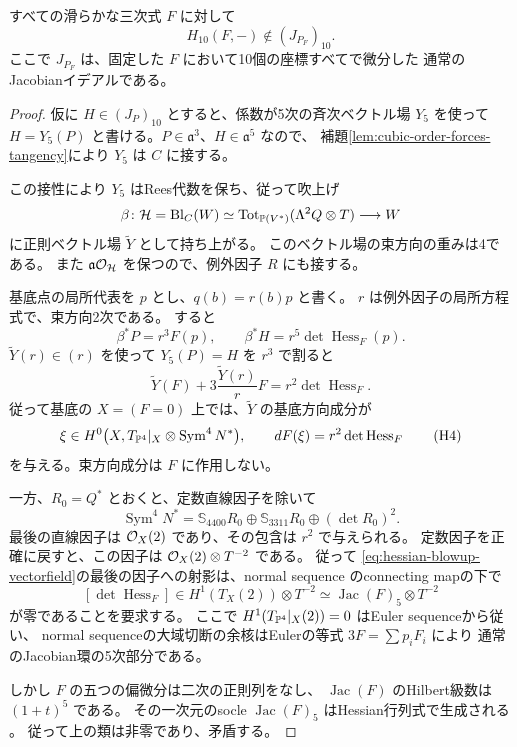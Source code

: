 \begin{theorem}
\label{thm:all-smooth-hessian-jacobian}
すべての滑らかな三次式 $F$ に対して
\[
 \boxed{\quad H_{10}(F,-)\notin(J_{P_F})_{10}.\quad}
\]
ここで $J_{P_F}$ は、固定した $F$ において10個の座標すべてで微分した
通常のJacobianイデアルである。
\end{theorem}
\begin{proof}
仮に $H\in(J_P)_{10}$ とすると、係数が5次の斉次ベクトル場 $Y_5$ を使って
$H=Y_5(P)$ と書ける。$P\in\mathfrak a^3$、$H\in\mathfrak a^5$ なので、
補題\ref{lem:cubic-order-forces-tangency}により $Y_5$ は $C$ に接する。

この接性により $Y_5$ はRees代数を保ち、従って吹上げ
\[
 \beta\colon\mathcal H=\operatorname{Bl}_C(W)
 \simeq\operatorname{Tot}_{\mathbb P(V^*)}(\Lambda^2Q\otimes T)
 \longrightarrow W
\]
に正則ベクトル場 $\widetilde Y$ として持ち上がる。
このベクトル場の束方向の重みは4である。
また $\mathfrak a\mathcal O_{\mathcal H}$ を保つので、例外因子 $R$ にも接する。

基底点の局所代表を $p$ とし、$q(b)=r(b)p$ と書く。
$r$ は例外因子の局所方程式で、束方向2次である。
すると
\[
 \beta^*P=r^3F(p),\qquad
 \beta^*H=r^5\det\operatorname{Hess}_F(p).
\]
$\widetilde Y(r)\in(r)$ を使って $Y_5(P)=H$ を $r^3$ で割ると
\[
 \widetilde Y(F)+3\frac{\widetilde Y(r)}rF
       =r^2\det\operatorname{Hess}_F.
\]
従って基底の $X=(F=0)$ 上では、$\widetilde Y$ の基底方向成分が
\[
 \xi\in H^0\bigl(X,T_{\mathbb P^4}|_X\otimes\operatorname{Sym}^4N^*\bigr),
 \qquad
 dF(\xi)=r^2\det\operatorname{Hess}_F
 \tag{H4}\label{eq:hessian-blowup-vectorfield}
\]
を与える。束方向成分は $F$ に作用しない。

一方、$R_0=Q^*$ とおくと、定数直線因子を除いて
\[
 \operatorname{Sym}^4N^*
   =\mathbb S_{4400}R_0\oplus\mathbb S_{3311}R_0
      \oplus(\det R_0)^2.
\]
最後の直線因子は $\mathcal O_X(2)$ であり、その包含は $r^2$ で与えられる。
定数因子を正確に戻すと、この因子は $\mathcal O_X(2)\otimes T^{-2}$ である。
従って \eqref{eq:hessian-blowup-vectorfield}の最後の因子への射影は、normal sequence のconnecting mapの下で
\[
 [\det\operatorname{Hess}_F]\in
 H^1(T_X(2))\otimes T^{-2}
 \simeq\operatorname{Jac}(F)_5\otimes T^{-2}
\]
が零であることを要求する。
ここで $H^1(T_{\mathbb P^4}|_X(2))=0$ はEuler sequenceから従い、
normal sequenceの大域切断の余核はEulerの等式 $3F=\sum p_iF_i$ により
通常のJacobian環の5次部分である。

しかし $F$ の五つの偏微分は二次の正則列をなし、
$\operatorname{Jac}(F)$ のHilbert級数は $(1+t)^5$ である。
その一次元のsocle $\operatorname{Jac}(F)_5$ はHessian行列式で生成される
\cite[p.~2]{BDSS}。
従って上の類は非零であり、矛盾する。
\end{proof}

